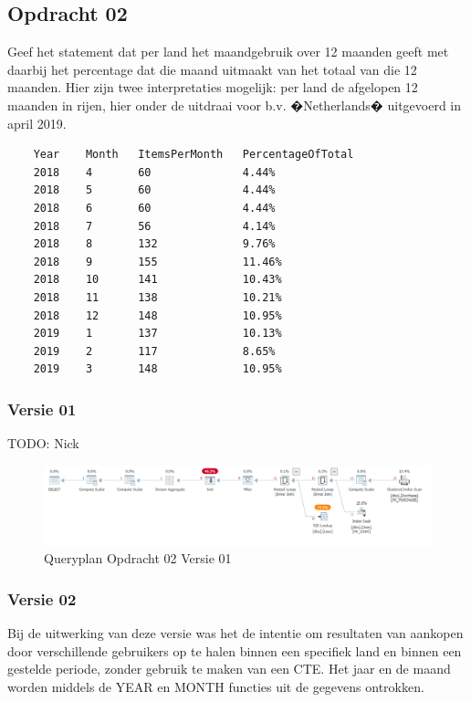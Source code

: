 \subsection{Opdracht 02}
Geef het statement dat per land het maandgebruik over 12 maanden geeft met daarbij het percentage dat die maand uitmaakt van het totaal van die 12 maanden.
Hier zijn twee interpretaties mogelijk: per land de afgelopen 12 maanden in rijen, hier onder de uitdraai voor b.v. �Netherlands� uitgevoerd in april 2019.

\begin{lstlisting}
    Year	Month	ItemsPerMonth	PercentageOfTotal
    2018	4	    60		        4.44%
    2018	5	    60		        4.44%
    2018	6	    60		        4.44%
    2018	7	    56		        4.14%
    2018	8	    132		        9.76%
    2018	9	    155		        11.46%
    2018	10	    141		        10.43%
    2018	11	    138		        10.21%
    2018	12	    148		        10.95%
    2019	1	    137		        10.13%
    2019	2	    117		        8.65%
    2019	3	    148		        10.95%
\end{lstlisting}

\subsubsection{Versie 01}
TODO: Nick

\begin{figure}[H]
    \centering
    \includegraphics[width=1\textwidth]{image/nick/opdracht-02a.PNG}
    \caption{Queryplan Opdracht 02 Versie 01}
\end{figure}

\subsubsection{Versie 02}

    Bij de uitwerking van deze versie was het de intentie om resultaten van aankopen door verschillende gebruikers
    op te halen binnen een specifiek land en binnen een gestelde periode, zonder gebruik te maken van een CTE. Het jaar en de maand
    worden middels de YEAR en MONTH functies uit de gegevens ontrokken.

